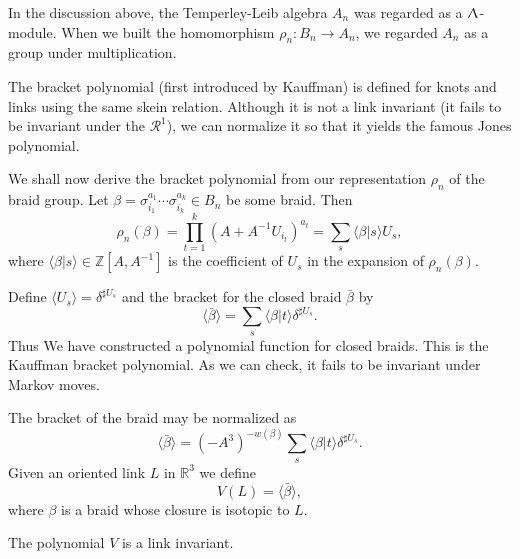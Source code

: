 \begin{remark}
\label{sec:temp-lieb-algebra-4}
In the discussion above, the Temperley-Leib algebra $A_n$ was regarded as a $\Uplambda$-module. When we built the homomorphism $\rho_n: B_n \to A_n$, we regarded $A_n$ as a group under multiplication.
\end{remark}


The bracket polynomial (first introduced by Kauffman) is defined for knots and links using the same skein relation. Although it is not a link invariant (it fails to be invariant under the $\mathcal{R}^1$), we can normalize it so that it yields the famous Jones polynomial.

We shall now derive the bracket polynomial from our representation $\rho_n$ of the braid group. Let $\beta = \sigma^{a_1}_{i_1}\cdots \sigma^{a_k}_{i_k} \in B_n$ be some braid. Then
\begin{equation}
\rho_n(\beta) = \prod^k_{t=1} (A+A^{-1}U_{i_t})^{a_t} = \sum_s \langle \beta | s \rangle U_s,
\end{equation}
where $\langle \beta | s \rangle \in \mathbb{Z}[A, A^{-1}]$ is the coefficient of $U_s$ in the expansion of $\rho_n(\beta)$.

Define $\langle U_s \rangle = \delta^{\sharp U_s}$ and the bracket for the closed braid $\bar{\beta}$ by 
\begin{equation}
\langle \bar{\beta} \rangle = \sum_s \langle \beta | t \rangle \delta^{\sharp U_s}.
\end{equation}
Thus We have constructed a polynomial function for closed braids. This is the Kauffman bracket polynomial. As we can check, it fails to be invariant under Markov moves.

The bracket of the braid may be normalized as
\begin{equation}
  \langle \bar{\beta} \rangle = (-A^3)^{-w(\beta)} \sum_s \langle \beta | t \rangle \delta^{\sharp U_s}.
\end{equation}
  Given an oriented link $L$ in $\mathbb{R}^3$ we define 
\begin{equation}
V(L) = \langle \bar{\beta} \rangle,
\end{equation}
where $\beta$ is a braid whose closure is isotopic to $L$.

\begin{theorem}
The polynomial $V$ is a link invariant.
\end{theorem}
  
